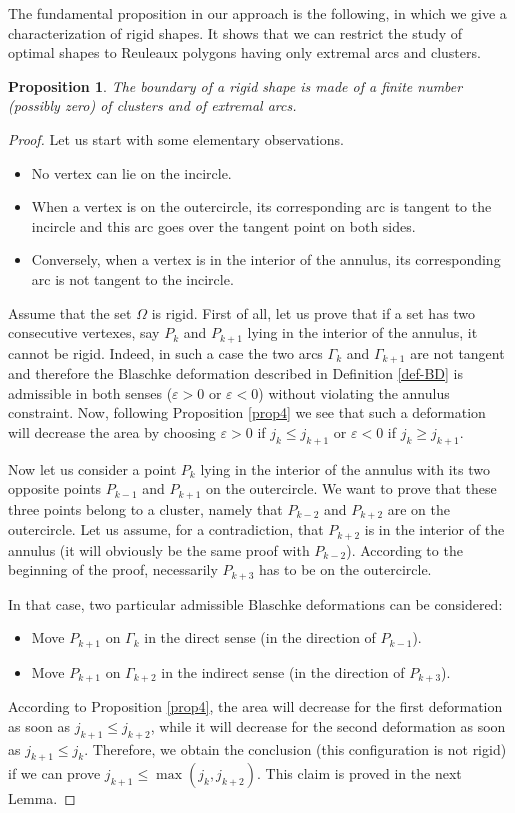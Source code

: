 \documentclass[11pt]{article}
\numberwithin{equation}{section}
\let\epsilon\varepsilon
\theoremstyle{plain}
\newtheorem{proposition}[theorem]{Proposition}
\theoremstyle{definition}
\let \e\epsilon
\begin{document}
The fundamental proposition in our approach is the following, {in which we give a characterization of rigid shapes}. It shows that we can restrict
the study of optimal shapes to Reuleaux polygons having only extremal arcs and clusters.
\begin{proposition}\label{propfund}
The boundary of a rigid shape is made of a finite number (possibly zero) of clusters and of extremal arcs.
\end{proposition}
\begin{proof}
Let us start with some elementary observations.
\begin{itemize}
\item No vertex can lie on the incircle.
\item When a vertex is on the outercircle, its corresponding arc is tangent to the incircle
and this arc goes over the tangent point on both sides.
\item Conversely, when a vertex is in the interior of the annulus, its corresponding arc is not
tangent to the incircle.
\end{itemize}

Assume that the set $\Omega$ is rigid.
First of all, let us prove that if a set has two consecutive vertexes, say $P_k$ and $P_{k+1}$
lying in the interior of the annulus, it cannot be rigid. Indeed, in such a case the two arcs
$\Gamma_k$ and $\Gamma_{k+1}$ are not tangent
and therefore the Blaschke deformation described in Definition
\ref{def-BD} is admissible in both senses ($\e>0$ or $\e<0$) without violating the annulus
constraint. Now, following Proposition \ref{prop4} we see that such a deformation will decrease the area by choosing $\e>0$ if $j_k\leq j_{k+1}$ or $\e<0$ if $j_k\geq j_{k+1}$.

Now let us consider a point $P_k$ lying in the interior of the annulus with its two
opposite points $P_{k-1}$ and $P_{k+1}$ on the outercircle. We want to prove
that these three points belong to a cluster, namely that $P_{k-2}$ and $P_{k+2}$ are
on the outercircle. Let us assume, for a contradiction, that $P_{k+2}$ is in the interior
of the annulus (it will obviously be the same proof with $P_{k-2}$). According to the beginning of the
proof, necessarily $P_{k+3}$ has to be on the outercircle.

In that case, two particular admissible Blaschke deformations can be considered:
\begin{itemize}
\item Move $P_{k+1}$ on $\Gamma_k$ in the direct sense (in the direction of $P_{k-1}$).
\item Move $P_{k+1}$ on $\Gamma_{k+2}$ in the indirect sense (in the direction of $P_{k+3}$).
\end{itemize}
According to Proposition \ref{prop4}, the area will decrease for the first deformation
as soon as $j_{k+1} \leq j_{k+2}$, while it will decrease for the second deformation
as soon as $j_{k+1} \leq j_{k}$. Therefore, we obtain the conclusion (this configuration
is not rigid) if we can prove $j_{k+1} \leq \max(j_{k},j_{k+2})$. This claim is proved in the next Lemma.
\end{proof}
\end{document}

